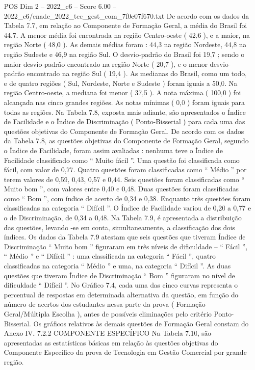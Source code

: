 \begin{textsample}{POS Dim 2 – 2022\_c6 – Score 6.00 – 2022\_c6/enade\_2022\_tec\_gest\_com\_7f0e07f670.txt}
De acordo com os dados da Tabela 7.7, em relação ao Componente de Formação Geral, a média do Brasil foi 44,7.
A menor média foi encontrada na região Centro-oeste ( 42,6 ), e a maior, na região Norte ( 48,0 ).
As demais médias foram : 44,3 na região Nordeste, 44,8 na região Sudeste e 46,9 na região Sul.
O desvio-padrão do Brasil foi 19,7 ; sendo o maior desvio-padrão encontrado na região Norte ( 20,7 ), e o menor desvio-padrão encontrado na região Sul ( 19,4 ).
As medianas do Brasil, como um todo, e de quatro regiões ( Sul, Nordeste, Norte e Sudeste ) foram iguais a 50,0.
Na região Centro-oeste, a mediana foi menor ( 37,5 ).
A nota máxima ( 100,0 ) foi alcançada nas cinco grandes regiões.
As notas mínimas ( 0,0 ) foram iguais para todas as regiões.
Na Tabela 7.8, exposta mais adiante, são apresentados o Índice de Facilidade e o Índice de Discriminação ( Ponto-Bisserial ) para cada uma das questões objetivas do Componente de Formação Geral.
De acordo com os dados da Tabela 7.8, as questões objetivas do Componente de Formação Geral, segundo o Índice de Facilidade, foram assim avaliadas : nenhuma teve o Índice de Facilidade classificado como “ Muito fácil ”.
Uma questão foi classificada como fácil, com valor de 0,77.
Quatro questões foram classificadas como “ Médio ” por terem valores de 0,59, 0,43, 0,57 e 0,44.
Seis questões foram classificadas como “ Muito bom ”, com valores entre 0,40 e 0,48.
Duas questões foram classificadas como “ Bom ”, com índice de acerto de 0,34 e 0,38.
Enquanto três questões foram classificadas na categoria “ Difícil ”.
O Índice de Facilidade variou de 0,20 a 0,77 e o de Discriminação, de 0,34 a 0,48.
Na Tabela 7.9, é apresentada a distribuição das questões, levando -se em conta, simultaneamente, a classificação dos dois índices.
Os dados da Tabela 7.9 atestam que seis questões que tiveram Índice de Discriminação “ Muito bom ” figuraram em três níveis de dificuldade – “ Fácil ”, “ Médio ” e “ Difícil ” : uma classificada na categoria “ Fácil ”, quatro classificadas na categoria “ Médio ” e uma, na categoria “ Difícil ”.
As duas questões que tiveram Índice de Discriminação “ Bom ” figuraram no nível de dificuldade “ Difícil ”.
No Gráfico 7.4, cada uma das cinco curvas representa o percentual de respostas em determinada alternativa da questão, em função do número de acertos dos estudantes nessa parte da prova ( Formação Geral/Múltipla Escolha ), antes de possíveis eliminações pelo critério Ponto-Bisserial.
Os gráficos relativos às demais questões de Formação Geral constam do Anexo IV. 7.2.2 COMPONENTE ESPECÍFICO Na Tabela 7.10, são apresentadas as estatísticas básicas em relação às questões objetivas do Componente Específico da prova de Tecnologia em Gestão Comercial por grande região.

\end{textsample}
